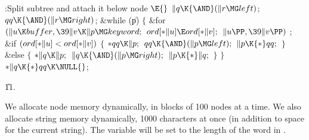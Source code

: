 \Y\B\4:Split subtree  and attach it below node \X${}\E{}$\6
$\|q\K{\AND}(\|r\MG\\{left}){}$;\5
${}\\{qq}\K{\AND}(\|r\MG\\{right}){}$;\6
\&{while} (\|p)\5
${}\{{}$\1\6
\&{for} ${}(\|u\K\\{buffer},\39\|v\K\|p\MG\\{keyword};{}$ ${}\\{ord}[{*}\|u]\E%
\\{ord}[{*}\|v];{}$ ${}\|u\PP,\39\|v\PP){}$\1\5
;\2\6
\&{if} ${}(\\{ord}[{*}\|u]<\\{ord}[{*}\|v]){}$\5
${}\{{}$\1\6
${}{*}\\{qq}\K\|p;{}$\6
${}\\{qq}\K{\AND}(\|p\MG\\{left});{}$\6
${}\|p\K{*}\\{qq};{}$\6
\4${}\}{}$\2\6
\&{else}\5
${}\{{}$\1\6
${}{*}\|q\K\|p;{}$\6
${}\|q\K{\AND}(\|p\MG\\{right});{}$\6
${}\|p\K{*}\|q;{}$\6
\4${}\}{}$\2\6
\4${}\}{}$\2\6
${}{*}\|q\K{*}\\{qq}\K\NULL{}$;\par
\U11.\fi

We allocate node memory dynamically, in blocks of 100 nodes at a time.
We also allocate string memory dynamically, 1000 characters at once
(in addition to space for the current string).
The variable  will be set to the length of the word in .

